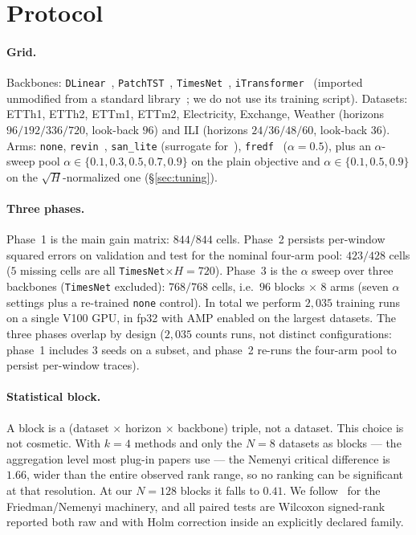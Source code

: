 \documentclass[a4paper,fleqn]{cas-sc}
\newcommand{\arm}[1]{\texttt{#1}}
\begin{document}
\section{Protocol}
\label{sec:protocol}

\paragraph{Grid.}
Backbones: \arm{DLinear}~\cite{dlinear}, \arm{PatchTST}~\cite{patchtst},
\arm{TimesNet}~\cite{timesnet}, \arm{iTransformer}~\cite{itrans}
(imported unmodified from a standard library~\cite{tslib}; we do not use its
training script). Datasets: ETTh1, ETTh2, ETTm1, ETTm2, Electricity, Exchange,
Weather (horizons $96/192/336/720$, look-back $96$) and ILI (horizons
$24/36/48/60$, look-back $36$). Arms: \arm{none}, \arm{revin}~\cite{revin},
\arm{san\_lite} (surrogate for~\cite{san}), \arm{fredf}~\cite{fredf}
($\alpha{=}0.5$), plus an $\alpha$-sweep pool
$\alpha\in\{0.1,0.3,0.5,0.7,0.9\}$ on the plain objective and
$\alpha\in\{0.1,0.5,0.9\}$ on the $\sqrt{H}$-normalized one
(\S\ref{sec:tuning}).

\paragraph{Three phases.}
Phase~1 is the main gain matrix: $844/844$ cells. Phase~2 persists per-window
squared errors on validation and test for the nominal four-arm pool:
$423/428$ cells ($5$ missing cells are all \arm{TimesNet}$\times H{=}720$).
Phase~3 is the $\alpha$ sweep over three backbones (\arm{TimesNet} excluded):
$768/768$ cells, i.e.\ $96$ blocks $\times$ $8$ arms (seven $\alpha$ settings
plus a re-trained \arm{none} control). In total we perform $2{,}035$ training
runs on a single V100 GPU, in fp32 with AMP enabled on the largest datasets. The
three phases overlap by design ($2{,}035$ counts runs, not
distinct configurations: phase~1 includes $3$ seeds on a subset, and phase~2
re-runs the four-arm pool to persist per-window traces).

\paragraph{Statistical block.}
A block is a (dataset $\times$ horizon $\times$ backbone) triple, not a dataset.
This choice is not cosmetic. With $k{=}4$ methods and only the $N{=}8$ datasets
as blocks --- the aggregation level most plug-in papers use --- the Nemenyi
critical difference is $1.66$, wider than the entire observed rank range, so no
ranking can be significant at that resolution. At our $N{=}128$ blocks it falls
to $0.41$. We follow~\cite{demsar}
for the Friedman/Nemenyi machinery, and all paired tests are Wilcoxon
signed-rank reported both raw and with Holm correction inside an explicitly
declared family.
\end{document}
